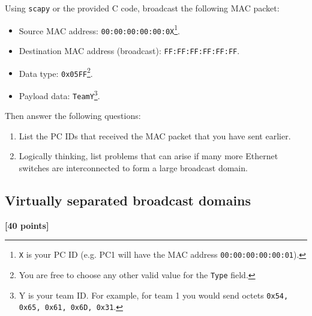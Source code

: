 \documentclass[pdftex,12pt,a4paper]{article}
\begin{document}
            Using \texttt{scapy} or the provided C code, broadcast the
            following MAC packet:
            \begin{itemize}
                \item Source MAC address:
                    \texttt{00:00:00:00:00:0X}\footnote{\texttt{X} is your PC
                    ID (e.g. PC1 will have the MAC address
                    \texttt{00:00:00:00:00:01}).}.
                \item Destination MAC address (broadcast): \texttt{FF:FF:FF:FF:FF:FF}.
                \item Data type: \texttt{0x05FF}\footnote{You are free to choose any
                    other valid value for the \texttt{Type} field.}.
                \item Payload data: \texttt{TeamY}\footnote{Y is your team ID. For
                    example, for team 1 you would send octets \texttt{0x54,
                    0x65, 0x61, 0x6D, 0x31}.}.
            \end{itemize}

            Then answer the following questions:
            \begin{enumerate}
                \item List the PC IDs that received the MAC packet that you
                    have sent earlier.
                \item Logically thinking, list problems that can arise if many
                    more Ethernet switches are interconnected to form a large
                    broadcast domain.
            \end{enumerate}


        \subsection{Virtually separated broadcast domains}
            \begin{flushright}
                \textbf{[40 points]}
            \end{flushright}
\end{document}
